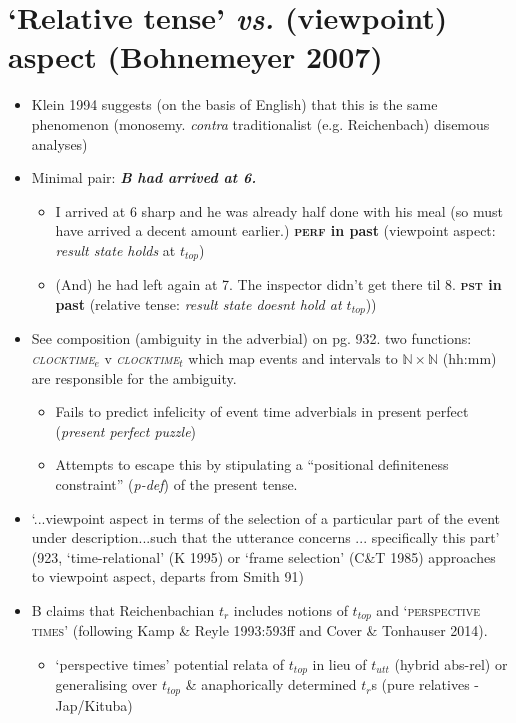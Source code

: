 \documentclass[10pt]{article}
\begin{document}
\section{`Relative tense' \textit{vs.} (viewpoint) aspect (Bohnemeyer 2007)}
\begin{itemize}
	\item Klein 1994 suggests (on the basis of English) that this is the same phenomenon (monosemy. \textit{contra} traditionalist (e.g. Reichenbach) disemous analyses)
	\item Minimal pair:\textbf{\textit{ B had arrived at 6.}}
\begin{itemize}
	\item  I arrived at 6 sharp and he was already half done with his meal (so must have arrived a decent amount earlier.) \textbf{\textsc{perf} in past} (viewpoint aspect: \textit{result state holds} at $ t_{top} $)
	\item (And) he had left again at 7. The inspector didn't get there til 8. \textbf{\textsc{pst} in past} (relative tense: \textit{result state doesnt hold at $ t_{top} $}))
\end{itemize}
\item See composition (ambiguity in the adverbial) on pg. 932. two functions: \textit{\textsc{clocktime}$ _{e} $} v \textit{\textsc{clocktime}$ _{t} $} which map events and intervals to $ \mathbb N\times\mathbb N $ (hh:mm) are responsible for the ambiguity.
\begin{itemize}
	\item Fails to predict infelicity of event time adverbials in present perfect (\textit{present perfect puzzle})
	\item Attempts to escape this by stipulating a ``positional definiteness constraint'' (\textit{p-def}) of the present tense.
\end{itemize}
\item `...viewpoint aspect in terms of the selection of a particular part of the event under description...such that the utterance concerns ... specifically this part' (923, `time-relational' (K 1995) or `frame selection' (C\&T 1985) approaches to viewpoint aspect, departs from Smith 91)
\item B claims that Reichenbachian $ t_r $ includes notions of $ t_{top} $ and `\textsc{perspective times'} (following Kamp \& Reyle 1993:593ff and Cover \& Tonhauser 2014).
\begin{itemize}
	\item `perspective times' potential relata of $ t_{top} $ in lieu of $ t_{utt} $ (hybrid abs-rel) or generalising over $ t_{top} $ \& anaphorically determined $ t_r $s (pure relatives - Jap/Kituba)

\end{itemize}
\end{itemize}
\end{document}
